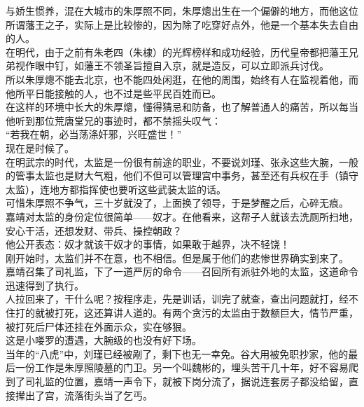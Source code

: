 \begin{multicols}{\theparacolNo}
与娇生惯养，混在大城市的朱厚照不同，朱厚熜出生在一个偏僻的地方，而他这位所谓藩王之子，实际上是比较惨的，因为除了吃穿好点外，他是一个基本失去自由的人。\\

在明代，由于之前有朱老四（朱棣）的光辉榜样和成功经验，历代皇帝都把藩王兄弟视作眼中钉，如藩王不领圣旨擅自入京，就是造反，可以立即派兵讨伐。\\

所以朱厚熜不能去北京，也不能四处闲逛，在他的周围，始终有人在监视着他，而他所平日能接触的人，也不过是些平民百姓而已。\\

在这样的环境中长大的朱厚熜，懂得猜忌和防备，也了解普通人的痛苦，所以每当他听到那位荒唐堂兄的事迹时，都不禁摇头叹气：\\

“若我在朝，必当荡涤奸邪，兴旺盛世！”\\

现在是时候了。\\

在明武宗的时代，太监是一份很有前途的职业，不要说刘瑾、张永这些大腕，一般的管事太监也是财大气粗，他们不但可以管理宫中事务，甚至还有兵权在手（镇守太监），连地方都指挥使也要听这些武装太监的话。\\

可惜朱厚照不争气，三十岁就没了，上面换了领导，于是梦醒之后，心碎无痕。\\

嘉靖对太监的身份定位很简单——奴才。在他看来，这帮子人就该去洗厕所扫地，安心干活，还想发财、带兵、操控朝政？\\

他公开表态：奴才就该干奴才的事情，如果敢于越界，决不轻饶！\\

刚开始时，太监们并不在意，也不相信。但是属于他们的悲惨世界确实到来了。\\

嘉靖召集了司礼监，下了一道严厉的命令——召回所有派驻外地的太监，这道命令迅速得到了执行。\\

人拉回来了，干什么呢？按程序走，先是训话，训完了就查，查出问题就打，经不住打的就被打死，这还算讲人道的。有两个贪污的太监由于数额巨大，情节严重，被打死后尸体还挂在外面示众，实在够狠。\\

这是小喽罗的遭遇，大腕级的也没有好下场。\\

当年的“八虎”中，刘瑾已经被剐了，剩下也无一幸免。谷大用被免职抄家，他的最后一份工作是朱厚照陵墓的门卫。另一个叫魏彬的，埋头苦干几十年，好不容易爬到了司礼监的位置，嘉靖一声令下，就被下岗分流了，据说连套房子都没给留，直接撵出了宫，流落街头当了乞丐。\\


\end{multicols}
